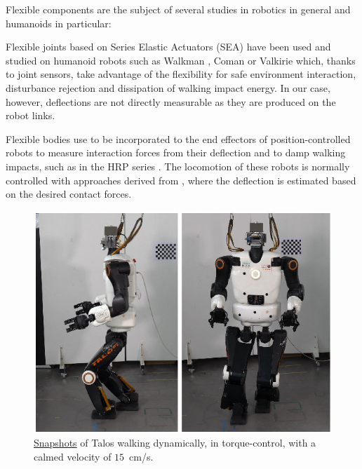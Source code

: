 \documentclass[letterpaper, 10 pt, conference]{ieeeconf}  %
\begin{document}
Flexible components are the subject of several studies in robotics in general \cite{DeLucca2016Flexibility} and humanoids in particular:

Flexible joints based on Series Elastic Actuators (SEA) \cite{Pratt2002SEAs, PetitDA15} have been used and studied on humanoid robots such as Walkman \cite{negrello:icra:2016}, Coman \cite{Lee2013COMAN_SEAS} or Valkirie \cite{Paine2015ValkyrieActuation} which, thanks to joint sensors, take advantage of the flexibility for safe environment interaction, disturbance rejection and dissipation of walking impact energy. In our case, however, deflections are not directly measurable as they are produced on the robot links.

Flexible bodies use to be incorporated to the end effectors of position-controlled robots to measure interaction forces from their deflection and to damp walking impacts, such as in the HRP series \cite{Benallegue2015_HRP-2_flexEstim, Caron2019stair, Napoleon2005analysis}. The locomotion of these robots is normally controlled with approaches derived from \cite{kajita:icra:2001}, where the deflection is estimated based on the desired contact forces. 

\begin{figure}[t!]
\centering
\includegraphics[width=.45\textwidth]{images/Talos_walking_picture.jpeg}
\caption{\!\!\!\!\href{https://gepettoweb.laas.fr/articles/talos_centroidal_mpc_torque_control.html}{Snapshots} of Talos walking dynamically, in torque-control, with a calmed velocity of $15$~cm/s.}
\label{Fig.Walking}
\end{figure}

\end{document}
